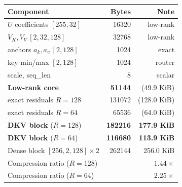 \begin{tabular}{lrr}
\toprule
Component & Bytes & Note \\
\midrule
$U$ coefficients $[255,32]$ & 16320 & low-rank \\
$V_K,V_V\ [2,32,128]$ & 32768 & low-rank \\
anchors $a_k,a_v\ [2,128]$ & 1024 & exact \\
key min/max $[2,128]$ & 1024 & router \\
scale, seq\_len & 8 & scalar \\
\midrule
\textbf{Low-rank core} & \textbf{51144} & (49.9 KiB) \\
exact residuals $R{=}128$ & 131072 & (128.0 KiB) \\
exact residuals $R{=}64$ & 65536 & (64.0 KiB) \\
\midrule
\textbf{DKV block} ($R{=}128$) & \textbf{182216} & \textbf{177.9 KiB} \\
\textbf{DKV block} ($R{=}64$) & \textbf{116680} & \textbf{113.9 KiB} \\
Dense block $[256,2,128]{\times}2$ & 262144 & 256.0 KiB \\
\midrule
Compression ratio ($R{=}128$) & \multicolumn{2}{r}{$1.44\times$} \\
Compression ratio ($R{=}64$) & \multicolumn{2}{r}{$2.25\times$} \\
\bottomrule
\end{tabular}
